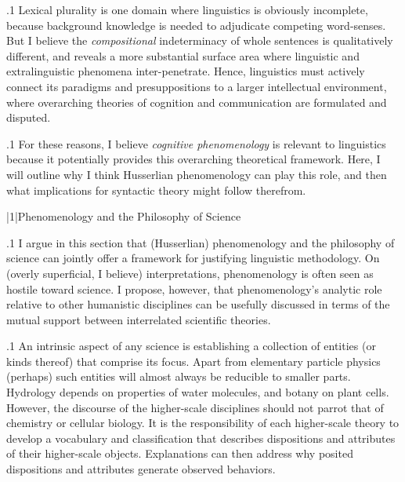 \documentclass[11pt, twocolumn]{article}
\begin{document}
\p.1{%
Lexical plurality is one domain where
linguistics is obviously incomplete, because background knowledge
is needed to adjudicate competing word-senses.  But I believe
the \textit{compositional} indeterminacy of whole sentences
is qualitatively different, and reveals a more substantial
surface area where linguistic and extralinguistic
phenomena inter-penetrate.  Hence, linguistics
must actively connect its paradigms and presuppositions
to a larger intellectual environment, where
overarching theories of cognition and communication
are formulated and disputed.
} %

\p.1{%
For these reasons, I believe \textit{cognitive phenomenology} is
relevant to linguistics because it potentially provides this
overarching theoretical framework.  Here, I will outline
why I think Husserlian phenomenology can play this role,
and then what implications for syntactic theory might follow
therefrom.
} %


\s|1|{Phenomenology and the Philosophy of Science}

\p.1{%
I argue in this section that (Husserlian) phenomenology and the philosophy of
science can jointly offer a framework for justifying linguistic
methodology.  On (overly superficial, I believe) interpretations,
phenomenology is often seen as hostile toward science.  I propose, however,
that phenomenology's analytic role relative to other humanistic
disciplines can be usefully discussed in terms of the mutual support
between interrelated scientific theories.
} %

\p.1{%
An intrinsic aspect of any science is establishing a collection of
entities (or kinds thereof) that comprise its focus.  Apart from
elementary particle physics (perhaps) such entities will almost
always be reducible to smaller parts.  Hydrology depends on
properties of water molecules, and botany on plant cells.
However, the discourse of the higher-scale disciplines should
not parrot that of chemistry or cellular biology.  It is the
responsibility of each higher-scale theory to develop a
vocabulary and classification that describes dispositions
and attributes of their higher-scale objects.  Explanations can
then address why posited dispositions and attributes
generate observed behaviors.
} %
\end{document}
